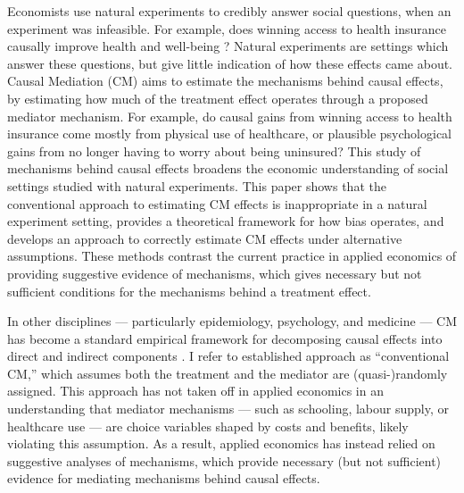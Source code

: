 Economists use natural experiments to credibly answer social questions, when an experiment was infeasible.
For example, does winning access to health insurance causally improve health and well-being \citep{finkelstein2008oregon}?
Natural experiments are settings which answer these questions, but give little indication of how these effects came about.
Causal Mediation (CM) aims to estimate the mechanisms behind causal effects, by estimating how much of the treatment effect operates through a proposed mediator mechanism.
For example, do causal gains from winning access to health insurance come mostly from physical use of healthcare, or plausible psychological gains from no longer having to worry about being uninsured?
This study of mechanisms behind causal effects broadens the economic understanding of social settings studied with natural experiments.
This paper shows that the conventional approach to estimating CM effects is inappropriate in a natural experiment setting, provides a theoretical framework for how bias operates, and develops an approach to correctly estimate CM effects under alternative assumptions.
These methods contrast the current practice in applied economics of providing suggestive evidence of mechanisms, which gives necessary but not sufficient conditions for the mechanisms behind a treatment effect.

In other disciplines --- particularly epidemiology, psychology, and medicine --- CM has become a standard empirical framework for decomposing causal effects into direct and indirect components 
\citep{imai2010identification}.
I refer to established approach as ``conventional CM,'' which assumes both the treatment and the mediator are (quasi-)randomly assigned.
This approach has not taken off in applied economics in an understanding that mediator mechanisms --- such as schooling, labour supply, or healthcare use --- are choice variables shaped by costs and benefits, likely violating this assumption.
As a result, applied economics has instead relied on suggestive analyses of mechanisms, which provide necessary (but not sufficient) evidence for mediating mechanisms behind causal effects.

